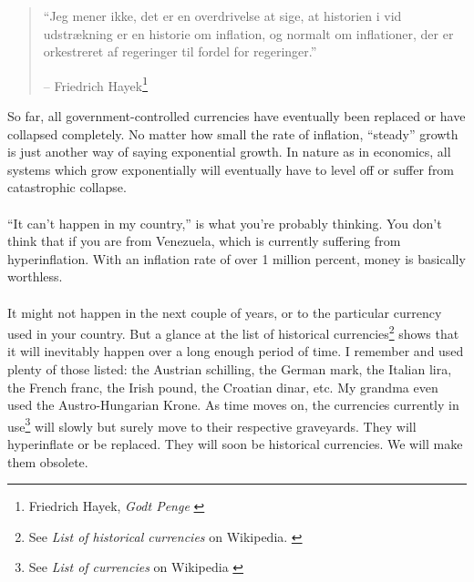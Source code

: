 \begin{quotation}\begin{samepage}
\enquote{Jeg mener ikke, det er en overdrivelse at sige, at historien i vid 
udstrækning er en historie om inflation, og normalt om inflationer, der er 
orkestreret af regeringer til fordel for regeringer.}
\begin{flushright} -- Friedrich Hayek\footnote{Friedrich Hayek, \textit{Godt Penge} \cite{hayek-good-money}}
\end{flushright}\end{samepage}\end{quotation}

\newpage

So far, all government-controlled currencies have eventually been
replaced or have collapsed completely. No matter how small the rate of
inflation, \enquote{steady} growth is just another way of saying exponential
growth. In nature as in economics, all systems which grow exponentially
will eventually have to level off or suffer from catastrophic collapse.

\paragraph{}
\enquote{It can't happen in my country,} is what you're probably thinking. 
You don't think that if you are from Venezuela, which is currently suffering 
from hyperinflation. With an inflation rate of over 1 million percent, money is
basically worthless. \cite{wiki:venezuela}

\paragraph{}
It might not happen in the next couple of years, or to the particular currency
used in your country. But a glance at the list of historical
currencies\footnote{See \textit{List of historical currencies} on Wikipedia.
\cite{wiki:historical-currencies}} shows that it will inevitably happen over a
long enough period of time. I remember and used plenty of those listed: the
Austrian schilling, the German mark, the Italian lira, the French franc, the
Irish pound, the Croatian dinar, etc. My grandma even used the Austro-Hungarian
Krone. As time moves on, the currencies currently in use\footnote{See
\textit{List of currencies} on Wikipedia \cite{wiki:list-of-currencies}} will
slowly but surely move to their respective graveyards. They will hyperinflate or
be replaced. They will soon be historical currencies. We will make them
obsolete.

